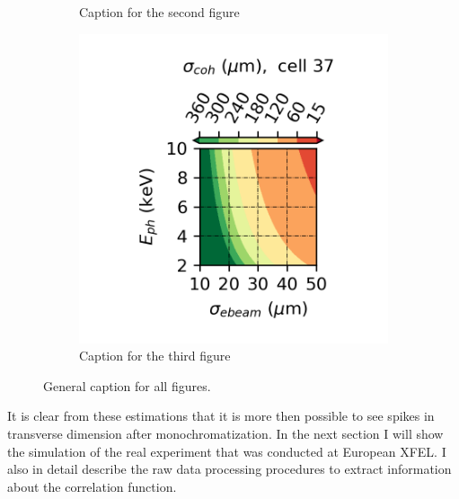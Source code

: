 \begin{figure}[h!]
\begin{subfigure}[b]{0.32\textwidth}
            \caption{Caption for the second figure}
            \label{Fig:cell_18}
        \end{subfigure}
        \hfill %
        \begin{subfigure}[b]{0.32\textwidth}
            \centering
            \includegraphics[trim={0.4cm 0 0.4cm 0}, clip, width=\textwidth]{content/images/ebeam_size_with_SR/cell 37.png}
            \caption{Caption for the third figure}
            \label{Fig:cell_37}
        \end{subfigure}
        \caption{General caption for all figures.} %
    \end{figure}
    It is clear from these estimations that it is more then possible to see spikes in transverse dimension after monochromatization. In the next section I will show the simulation of the real experiment that was conducted at European XFEL. I also in detail describe the raw data processing procedures to extract information about the correlation function.
    
